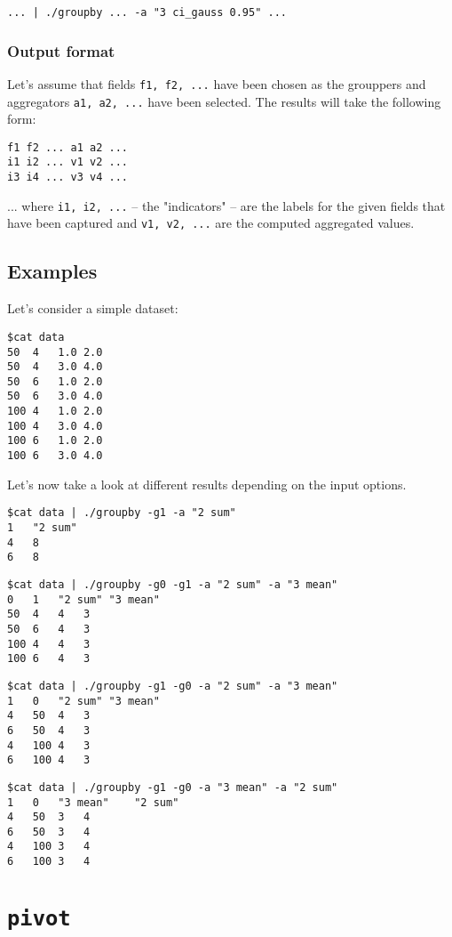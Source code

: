 \documentclass{report}
\begin{document}
\texttt{... | ./groupby ... -a "3 ci\_gauss 0.95" ...}

\subsubsection{Output format}
Let's assume that fields \texttt{f1, f2, ...} have been chosen as the
grouppers and aggregators \texttt{a1, a2, ...} have been selected.
The results will take the following form:
\begin{verbatim}
f1 f2 ... a1 a2 ...
i1 i2 ... v1 v2 ...
i3 i4 ... v3 v4 ...
\end{verbatim}

... where \texttt{i1, i2, ...} -- the "indicators" -- are the labels for
the given fields that have been captured and \texttt{v1, v2, ...} are
the computed aggregated values.

\subsection{Examples}
Let's consider a simple dataset:
\begin{verbatim}
$cat data
50	4	1.0	2.0
50	4	3.0	4.0
50	6	1.0	2.0
50	6	3.0	4.0
100	4	1.0	2.0
100	4	3.0	4.0
100	6	1.0	2.0
100	6	3.0	4.0
\end{verbatim}

Let's now take a look at different results depending on the input options.

\begin{verbatim}
$cat data | ./groupby -g1 -a "2 sum"
1	"2 sum"
4	8
6	8
\end{verbatim}

\begin{verbatim}
$cat data | ./groupby -g0 -g1 -a "2 sum" -a "3 mean"
0	1	"2 sum"	"3 mean"
50	4	4	3
50	6	4	3
100	4	4	3
100	6	4	3
\end{verbatim}

\begin{verbatim}
$cat data | ./groupby -g1 -g0 -a "2 sum" -a "3 mean"
1	0	"2 sum"	"3 mean"
4	50	4	3
6	50	4	3
4	100	4	3
6	100	4	3
\end{verbatim}

\begin{verbatim}
$cat data | ./groupby -g1 -g0 -a "3 mean" -a "2 sum"
1	0	"3 mean"	"2 sum"
4	50	3	4
6	50	3	4
4	100	3	4
6	100	3	4
\end{verbatim}

\section{\texttt{pivot}}
\end{document}
